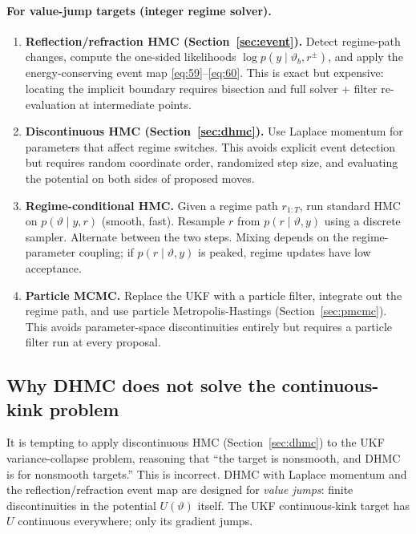 \documentclass[11pt]{article}
\begin{document}
\paragraph{For value-jump targets (integer regime solver).}
\begin{enumerate}
\item \textbf{Reflection/refraction HMC (Section~\ref{sec:event}).} Detect
      regime-path changes, compute the one-sided likelihoods
      $\log p(y\mid\vartheta_b, r^\pm)$, and apply the energy-conserving event
      map \eqref{eq:59}--\eqref{eq:60}. This is exact but expensive: locating
      the implicit boundary requires bisection and full solver + filter
      re-evaluation at intermediate points.
\item \textbf{Discontinuous HMC (Section~\ref{sec:dhmc}).} Use Laplace
      momentum for parameters that affect regime switches. This avoids explicit
      event detection but requires random coordinate order, randomized step
      size, and evaluating the potential on both sides of proposed moves.
\item \textbf{Regime-conditional HMC.} Given a regime path $r_{1:T}$, run
      standard HMC on $p(\vartheta\mid y,r)$ (smooth, fast). Resample $r$ from
      $p(r\mid\vartheta,y)$ using a discrete sampler. Alternate between the two
      steps. Mixing depends on the regime-parameter coupling; if $p(r\mid\vartheta,y)$
      is peaked, regime updates have low acceptance.
\item \textbf{Particle MCMC.} Replace the UKF with a particle filter,
      integrate out the regime path, and use particle Metropolis-Hastings
      (Section~\ref{sec:pmcmc}). This avoids parameter-space discontinuities
      entirely but requires a particle filter run at every proposal.
\end{enumerate}

\subsection{Why DHMC does not solve the continuous-kink problem}\label{sec:dhmc-limitation}

It is tempting to apply discontinuous HMC (Section~\ref{sec:dhmc}) to the UKF
variance-collapse problem, reasoning that ``the target is nonsmooth, and DHMC
is for nonsmooth targets.'' This is incorrect. DHMC with Laplace momentum and
the reflection/refraction event map are designed for \emph{value jumps}: finite
discontinuities in the potential $U(\vartheta)$ itself. The UKF
continuous-kink target has $U$ continuous everywhere; only its gradient jumps.
\end{document}
